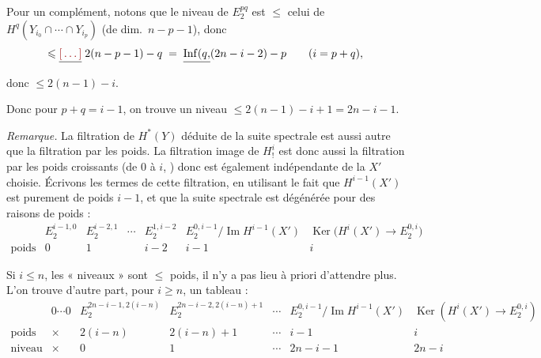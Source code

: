 \documentclass[11pt,a4paper]{article}
\begin{document}
Pour un complément, notons que le niveau de $E_{2}^{pq}$ est $\leqslant$ celui
de $H^{q}(Y_{i_{0}} \cap \cdots \cap Y_{i_{p}})$ (de dim.\ $n-p-1$), donc
\[
\leqslant \struck{\ill{}}\; 2(n-p-1) - q \;=\; \struck{\operatorname{Inf}(q,}
(2n-i-2) - p \qquad (i = p+q),
\]
donc $\leqslant 2(n-1)-i$.


Donc  pour $p+q = i-1$, on trouve un niveau
$\leqslant 2(n-1)-i+1 = 2n-i-1$.

\emph{Remarque.} La filtration de $H^{*}(Y)$ déduite de la suite spectrale
est aussi autre que la filtration par les poids. La filtration image de
$H^{i}_{!}$ est donc aussi la filtration par les poids croissants (de 0 à $i$,
\ill{}) donc est également indépendante de la 
$X'$ choisie. Écrivons les termes de cette filtration, en utilisant le fait que
$H^{i-1}(X')$ est purement de poids $i-1$, et  que la
suite spectrale est dégénérée pour des raisons de poids :
\[
\begin{array}{c|c|c|c|c|c|c}
 & E_{2}^{i-1,0} & E_{2}^{i-2,1} & \cdots & E_{2}^{1,i-2} &
 E_{2}^{0,i-1}/\operatorname{Im} H^{i-1}(X') &
 \operatorname{Ker}\bigl(H^{i}(X') \to E_{2}^{0,i}\bigr) \\
\hline
\text{poids} & 0 & 1 & & i-2 & i-1 & i
\end{array}
\]

 Si $i \leqslant n$, les « niveaux » sont
 $\leqslant$ poids, il n'y a pas lieu à priori d'attendre plus.
L'on trouve d'autre part, pour $i \geqslant n$, un tableau
 :
\[
\begin{array}{c|c|c|c|c|c|c}
 & 0 \cdots 0 & \scriptstyle E_{2}^{2n-i-1,2(i-n)} & \scriptstyle E_{2}^{2n-i-2,2(i-n)+1} & \cdots
 & \scriptstyle E_{2}^{0,i-1}/\operatorname{Im} H^{i-1}(X') &
 \scriptstyle \operatorname{Ker}(H^{i}(X') \to E_{2}^{0,i}) \\
\hline
\text{poids} & \times & 2(i-n) & 2(i-n)+1 & \cdots & i-1 & i \\
\hline
\text{niveau} & \times & 0 & 1 & \cdots & 2n-i-1 & 2n-i
\end{array}
\]
\end{document}
